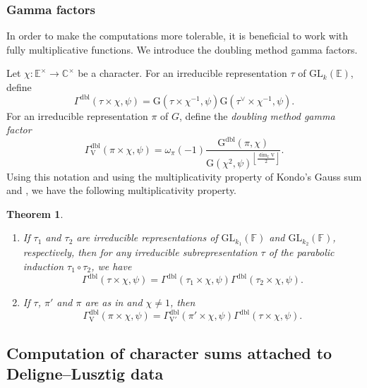 \documentclass[12pt, reqno]{amsart}
\newtheorem{theorem}{Theorem}[section]
\theoremstyle{definition}
\theoremstyle{definition}
\theoremstyle{definition}
\newcommand{\cComplex}{\mathbb{C}}
\newcommand{\multiplicativegroup}[1]{#1^{\times}}
\newcommand{\hermitianSpace}{\mathrm{V}}
\newcommand{\fieldCharacter}{\psi}
\newcommand{\centralCharacter}[1]{\omega_{#1}}
\newcommand{\Contragradient}[1]{#1^{\vee}}
\newcommand{\GL}{\mathrm{GL}}
\newcommand{\finiteField}{\mathbb{F}}
\newcommand{\quadraticExtension}{\mathbb{E}}
\newcommand{\GaussSumScalar}[2]{\mathrm{G}\left(#1, #2\right)}
\newcommand{\dblGaussSumScalar}[2]{\mathrm{G}^{\mathrm{dbl}}\left(#1, #2\right)}
\newcommand{\dblGammaFactor}[3]{\Gamma^{\mathrm{dbl}}\left(#1 \times #2, #3\right)}
\newcommand{\dblGammaFactorSpace}[4]{\Gamma^{\mathrm{dbl}}_{#1}\left(#2 \times #3, #4\right)}
\begin{document}
\subsubsection{Gamma factors}
In order to make the computations more tolerable, it is beneficial to work with fully multiplicative functions. We introduce the doubling method gamma factors.

Let $\chi \colon \multiplicativegroup{\quadraticExtension} \to \multiplicativegroup{\cComplex}$ be a character. For an irreducible representation  $\tau$ of $\GL_k\left(\quadraticExtension\right)$, define $$\dblGammaFactor{\tau}{\chi}{\fieldCharacter} = \GaussSumScalar{\tau \times \chi^{-1}}{\fieldCharacter} \GaussSumScalar{\Contragradient{\tau} \times \chi^{-1}}{\fieldCharacter}.$$
For an irreducible representation $\pi$ of $G$, define the \emph{doubling method gamma factor} $$\dblGammaFactorSpace{\hermitianSpace}{\pi}{\chi}{\fieldCharacter} = \centralCharacter{\pi}\left(-1\right) \frac{\dblGaussSumScalar{\pi}{\chi}}{\GaussSumScalar{\chi^2}{\fieldCharacter}^{\left\lfloor\frac{\dim_{\quadraticExtension} \hermitianSpace}{2}\right\rfloor}}.$$
Using this notation and using the multiplicativity property of Kondo's Gauss sum and , we have the following multiplicativity property.

\begin{theorem}\label{thm:multiplicativity-in-terms-of-gamma-factors}
	\begin{enumerate}
		\item If $\tau_1$ and $\tau_2$ are irreducible representations of $\GL_{k_1}\left(\finiteField\right)$ and $\GL_{k_2}\left(\finiteField\right)$, respectively, then for any irreducible subrepresentation $\tau$ of the parabolic induction $\tau_1 \circ \tau_2$, we have
		$$\dblGammaFactor{\tau}{\chi}{\fieldCharacter} = \dblGammaFactor{\tau_1}{\chi}{\fieldCharacter} \dblGammaFactor{\tau_2}{\chi}{\fieldCharacter}.$$
		\item If $\tau$, $\pi'$ and $\pi$ are as in  and $\chi \ne 1$, then
		$$\dblGammaFactorSpace{\hermitianSpace}{\pi}{\chi}{\fieldCharacter} = \dblGammaFactorSpace{\hermitianSpace'}{\pi'}{\chi}{\fieldCharacter} \dblGammaFactor{\tau}{\chi}{\fieldCharacter}.$$
	\end{enumerate}
\end{theorem}


\subsection{Computation of character sums attached to Deligne--Lusztig data}
\end{document}
